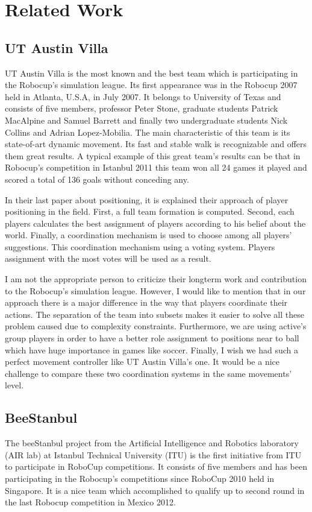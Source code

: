 \chapter{Related Work}
\label{related}

\section{UT Austin Villa}\cite{UTAustinVillaRobotSoccerTeam}
UT Austin Villa is the most known and the best team which is participating in the Robocup's simulation league. Its first appearance was in the Robocup 2007 held in Atlanta, U.S.A, in July 2007. It belongs to University of Texas and consists of five members, professor Peter Stone, 
graduate students Patrick MacAlpine and Samuel Barrett and finally two undergraduate students Nick Collins and Adrian Lopez-Mobilia. The main characteristic of this team is its state-of-art dynamic movement. Its fast and stable walk is recognizable and offers them great results. A typical example of this great team's results can be that in Robocup's competition in Istanbul 2011 this team won all 24 games it played and scored a total of 136 goals without conceding any.

In their last paper \cite{UtAustinVillaPaper} about positioning, it is explained their approach of player positioning in the field. First, a full team formation is computed. Second, each players calculates the best assignment of players according to his belief about the world. Finally, a coordination mechanism is used to choose among all players' suggestions. This coordination mechanism using a voting system. Players assignment with the most votes will be used as a result.

I am not the appropriate person to criticize their longterm work and contribution to the Robocup's simulation league. However, I would like to mention that in our approach there is a major difference in the way that players coordinate their actions. The separation of the team into subsets makes it easier to solve all these problem caused due to complexity constraints. Furthermore, we are using active's group players in order to have a better role assignment to positions near to ball which have huge importance in games like soccer. Finally, I wish we had such a perfect movement controller like UT Austin Villa's one. It would be a nice challenge to compare these two coordination systems in the same movements' level.


\section{BeeStanbul}
\cite{BeeStanbulTDP} The beeStanbul project from the Artificial Intelligence and Robotics laboratory
(AIR lab) at Istanbul Technical University (ITU) is the first initiative from ITU
to participate in RoboCup competitions. It consists of five members and has been participating in the Robocup's competitions since RoboCup 2010 held in Singapore. It is a nice team which accomplished to qualify up to second round in the last Robocup competition in Mexico 2012.


